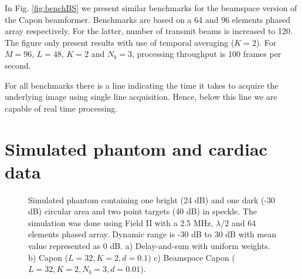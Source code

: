 \documentclass[12pt,journal,onecolumn]{IEEEtran}
\begin{document}
In Fig. \ref{fig:benchBS} we present similar benchmarks for the beamspace version of the Capon beamformer. Benchmarks are based on a 64 and 96 elements phased array respectively. For the latter, number of transmit beams is increased to 120. The figure only present results with use of temporal averaging ($K=2$). For $M=96$, $L=48$, $K=2$ and $N_b=3$, processing throughput is 100 frames per second.

For all benchmarks there is a line indicating the time it takes to acquire the underlying image using single line acquisition. Hence, below this line we are capable of real time processing.

\section{Simulated phantom and cardiac data}

\begin{figure}[!t]
\centerline{
\hfil
{}
\hfil
{}}
\caption{Simulated phantom containing one bright (24 dB) and one dark (-30 dB) circular area and two point targets (40 dB) in speckle. The simulation was done using Field II with a 2.5 MHz, $\lambda/2$ and 64 elements phased array. Dynamic range is -30 dB to 30 dB with mean value represented as 0 dB. a) Delay-and-sum with uniform weights. b) Capon ($L=32, K=2, d=0.1$) c) Beamspace Capon ($L=32, K=2, N_b=3, d=0.01$).}
\label{fig:phantom}
\end{figure}
\end{document}
